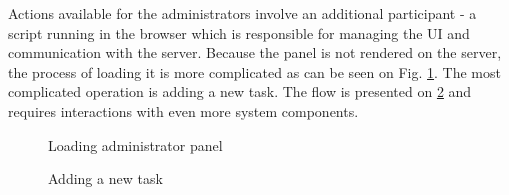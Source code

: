 Actions available for the administrators involve an additional participant - a script running in the browser which is responsible for managing the UI and communication with the server. Because the panel is not rendered on the server, the process of loading it is more complicated as can be seen on Fig. \ref{fig:seq-admin-load}. The most complicated operation is adding a new task. The flow is presented on \ref{fig:seq-admin-add-task} and requires interactions with even more system components.

\begin{figure}
    \centering
    
    \caption{Loading administrator panel}
    \label{fig:seq-admin-load}
\end{figure}

\begin{figure}
    \centering
    
    \caption{Adding a new task}
    \label{fig:seq-admin-add-task}
\end{figure}
